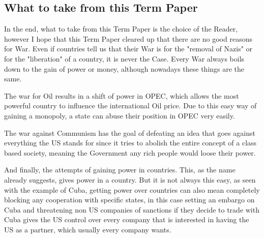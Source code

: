 \subsection{What to take from this Term Paper}
In the end, what to take from this Term Paper is the choice of the Reader, however I hope that this Term Paper cleared up that there are no good reasons for War. Even if countries tell us that their War is for the "removal of Nazis" or for the "liberation" of a country, it is never the Case. Every War always boils down to the gain of power or money, although nowadays these things are the same.

The war for Oil results in a shift of power in OPEC, which allows the most powerful country to influence the international Oil price. Due to this easy way of gaining a monopoly, a state can abuse their position in OPEC very easily.

The war against Communism has the goal of defeating an idea that goes against everything the US stands for since it tries to abolish the entire concept of a class based society, meaning the Government any rich people would loose their power.

And finally, the attempts of gaining power in countries. This, as the name already suggests, gives power in a country. But it is not always this easy, as seen with the example of Cuba, getting power over countries can also mean completely blocking any cooperation with specific states, in this case setting an embargo on Cuba and threatening non US companies of sanctions if they decide to trade with Cuba gives the US control over every company that is interested in having the US as a partner, which usually every company wants.